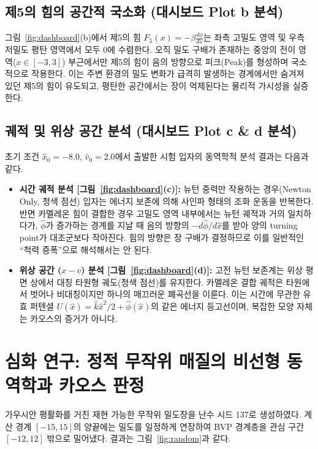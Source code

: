 \documentclass[11pt, a4paper]{article}
\begin{document}
\subsection{제5의 힘의 공간적 국소화 (대시보드 Plot b 분석)}
그림~\ref{fig:dashboard}(b)에서 제5의 힘 $F_5(x) = -\beta \frac{d\phi}{dx}$는 좌측 고밀도 영역 및 우측 저밀도 평탄 영역에서 모두 0에 수렴한다.
오직 밀도 구배가 존재하는 중앙의 전이 영역($x \in [-3, 3]$) 부근에서만 제5의 힘이 음의 방향으로 피크(Peak)를 형성하며 국소적으로 작용한다. 이는 주변 환경의 밀도 변화가 급격히 발생하는 경계에서만 숨겨져 있던 제5의 힘이 유도되고, 평탄한 공간에서는 장이 억제된다는 물리적 가시성을 실증한다.

\subsection{궤적 및 위상 공간 분석 (대시보드 Plot c \& d 분석)}
초기 조건 $\hat{x}_0=-8.0$, $\hat{v}_0=2.0$에서 출발한 시험 입자의 동역학적 분석 결과는 다음과 같다.
\begin{itemize}
    \item \textbf{시간 궤적 분석 [그림~\ref{fig:dashboard}(c)]:}
    뉴턴 중력만 작용하는 경우(Newton Only, 청색 점선) 입자는 에너지 보존에 의해 사인파 형태의 조화 운동을 반복한다. 
    반면 카멜레온 힘이 결합한 경우 고밀도 영역 내부에서는 뉴턴 궤적과 거의 일치하다가, $\hat\phi$가 증가하는 경계를 지날 때 음의 방향의 $-d\hat\phi/d\hat x$를 받아 양의 turning point가 대조군보다 작아진다. 힘의 방향은 장 구배가 결정하므로 이를 일반적인 ``척력 증폭''으로 해석해서는 안 된다.
    \item \textbf{위상 공간 ($x-v$) 분석 [그림~\ref{fig:dashboard}(d)]:}
    고전 뉴턴 보존계는 위상 평면 상에서 대칭 타원형 궤도(청색 점선)를 유지한다. 
    카멜레온 결합 궤적은 타원에서 벗어나 비대칭이지만 하나의 매끄러운 폐곡선을 이룬다. 이는 시간에 무관한 유효 퍼텐셜 $U(\hat x)=\hat k\hat x^2/2+\hat\phi(\hat x)$의 같은 에너지 등고선이며, 복잡한 모양 자체는 카오스의 증거가 아니다.
\end{itemize}

\section{심화 연구: 정적 무작위 매질의 비선형 동역학과 카오스 판정}

가우시안 평활화를 거친 재현 가능한 무작위 밀도장을 난수 시드 137로 생성하였다. 계산 경계 $[-15,15]$의 양끝에는 밀도를 일정하게 연장하여 BVP 경계층을 관심 구간 $[-12,12]$ 밖으로 밀어냈다. 결과는 그림~\ref{fig:random}과 같다.
\end{document}
